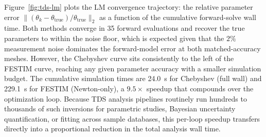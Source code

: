 Figure~\ref{fig:tds-lm} plots the LM convergence trajectory: the relative parameter error $\|(\theta_k - \theta_\text{true})/\theta_\text{true}\|_2$ as a function of the cumulative forward-solve wall time. Both methods converge in 35 forward evaluations and recover the true parameters to within the noise floor, which is expected given that the $2\%$ measurement noise dominates the forward-model error at both matched-accuracy meshes. However, the Chebyshev curve sits consistently to the left of the FESTIM curve, reaching any given parameter accuracy with a smaller simulation budget. The cumulative simulation times are \SI{24.0}{\second} for Chebyshev (full wall) and \SI{229.1}{\second} for FESTIM (Newton-only), a $9.5\times$ speedup that compounds over the optimization loop. Because TDS analysis pipelines routinely run hundreds to thousands of such inversions for parametric studies, Bayesian uncertainty quantification, or fitting across sample databases, this per-loop speedup transfers directly into a proportional reduction in the total analysis wall time.
